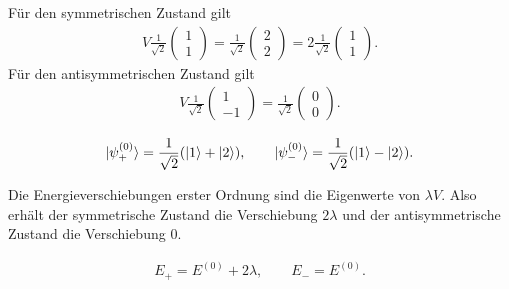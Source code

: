 \documentclass[11pt,a4paper]{scrartcl}
\begin{document}
\begin{enumerate}[label=(\alph*)]
\begin{calculationbox}
            \begin{calculationbox}[title=Diagonalisierung im entarteten Unterraum]
                Für den symmetrischen Zustand gilt
                \begin{align*}
                    V\frac{1}{\sqrt2}\begin{pmatrix}1\\1\end{pmatrix}
                    =
                    \frac{1}{\sqrt2}\begin{pmatrix}2\\2\end{pmatrix}
                    =
                    2\frac{1}{\sqrt2}\begin{pmatrix}1\\1\end{pmatrix}.
                \end{align*}
                Für den antisymmetrischen Zustand gilt
                \begin{align*}
                    V\frac{1}{\sqrt2}\begin{pmatrix}1\\-1\end{pmatrix}
                    =
                    \frac{1}{\sqrt2}\begin{pmatrix}0\\0\end{pmatrix}.
                \end{align*}

                \begin{solutionbox}[title=Richtige Zustände nullter Ordnung]
                    \begin{align*}
                        \ket{\psi_+^{(0)}}=\frac{1}{\sqrt2}(\ket1+\ket2),
                        \qquad
                        \ket{\psi_-^{(0)}}=\frac{1}{\sqrt2}(\ket1-\ket2).
                    \end{align*}
                \end{solutionbox}
            \end{calculationbox}

            \begin{calculationbox}[title=Energien erster Ordnung]
                Die Energieverschiebungen erster Ordnung sind die Eigenwerte von $\lambda V$. Also erhält der symmetrische Zustand die Verschiebung $2\lambda$ und der antisymmetrische Zustand die Verschiebung $0$.

                \begin{solutionbox}[title=Energien im entarteten Fall]
                    \begin{align*}
                        E_+=E^{(0)}+2\lambda,
                        \qquad
                        E_-=E^{(0)}.
                    \end{align*}
                \end{solutionbox}
            \end{calculationbox}


\end{calculationbox}
\end{enumerate}
\end{document}
